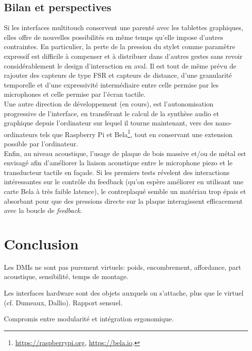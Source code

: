 \subsection{Bilan et perspectives}

\noindent Si les interfaces multitouch conservent une parenté avec les tablettes graphiques, elles offre de nouvelles possibilités en même temps qu'elle impose d'autres contraintes. En particulier, la perte de la pression du stylet comme paramètre expressif est difficile à compenser et à distribuer dans d'autres gestes sans revoir considérablement le design d'interaction en aval. Il est tout de même prévu de rajouter des capteurs de type \gls{FSR} et capteurs de distance, d'une granularité temporelle et d'une expressivité intermédiaire entre celle permise par les microphones et celle permise par l'écran tactile.\\
\indent Une autre direction de développement (en cours), est l'autonomisation progressive de l'interface, en transférant le calcul de la synthèse audio et graphique depuis l'ordinateur sur lequel il tourne maintenant, vers des nano-ordinateurs tels que Raspberry Pi et Bela\footnote{\url{https://raspberrypi.org}, \url{https://bela.io}.}, tout en conservant une extension possible par l'ordinateur.\\
\indent Enfin, au niveau acoustique, l'usage de plaque de bois massive et/ou de métal est envisagé afin d'améliorer la liaison acoustique entre le microphone piezo et le transducteur tactile en façade. Si les premiers tests révelent des interactions intéressantes sur le contrôle du feedback (qu'on espère améliorer en utilisant une carte Bela à très faible latence), le contreplaqué semble un matériau trop épais et absorbant pour que des pressions directe sur la plaque interagissent efficacement avec la boucle de \textit{feedback}.


\section{Conclusion}
\label{sec:interfaces:conclusion}

Les \glspl{DMI} ne sont pas purement virtuels: poids, encombrement, affordance, part acoustique, sensibilité, temps de montage.

Les interfaces hardware sont des objets auxquels on s'attache, plus que le virtuel (cf. Dumeaux, Dallio). Rapport sensuel.

Compromis entre modularité et intégration ergonomique.

